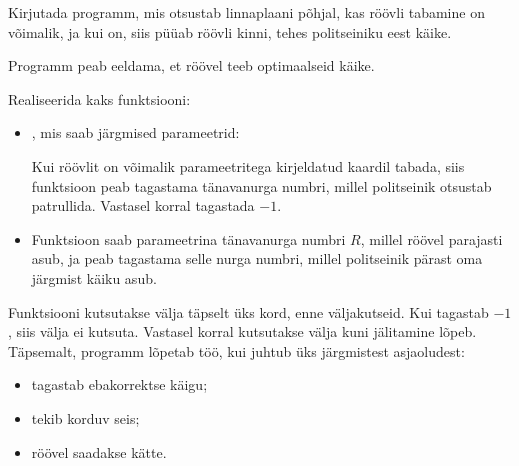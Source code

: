 \documentclass{boi2014}
\begin{document}
    \Task
    Kirjutada programm, mis otsustab linnaplaani põhjal, kas röövli tabamine on võimalik, ja kui on, siis püüab röövli kinni, tehes politseiniku eest käike.

    Programm peab eeldama, et röövel teeb optimaalseid käike.

    \Implementation
    Realiseerida kaks funktsiooni:
    \begin{itemize}
        \item {}, mis saab järgmised parameetrid:

        Kui röövlit on võimalik parameetritega kirjeldatud kaardil tabada,
        siis funktsioon  peab tagastama tänavanurga numbri,
        millel politseinik otsustab patrullida.
        Vastasel korral tagastada $-1$.

        \item Funktsioon  saab parameetrina tänavanurga
            numbri $R$, millel röövel parajasti asub,
            ja peab tagastama selle nurga numbri, millel politseinik pärast
            oma järgmist käiku asub.
    \end{itemize}

    	Funktsiooni  kutsutakse välja täpselt üks kord,
    enne  väljakutseid. Kui  tagastab
    $-1$, siis  välja ei kutsuta. Vastasel korral kutsutakse
     välja kuni jälitamine lõpeb.
    Täpsemalt, programm lõpetab töö, kui juhtub üks järgmistest
    asjaoludest:
    \begin{itemize}
        \item {} tagastab ebakorrektse käigu;
        \item tekib korduv seis;
        \item röövel saadakse kätte.
    \end{itemize}
\end{document}
